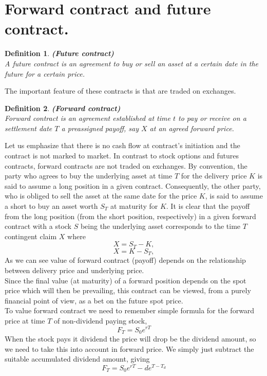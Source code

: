 \documentclass{book}
\newtheorem{definition}{Definition}[section]
\begin{document}
\section{Forward contract and future contract.}
\begin{definition}\textbf{(Future contract)}\\
A future contract is an agreement to buy or sell an asset at a certain date in the future for a certain price.
\end{definition}
The important feature of these contracts is that are traded on exchanges.
\begin{definition}\textbf{(Forward contract)}\\
Forward contract is an agreement established at time $t$ to pay or receive on a settlement date $T$ a preassigned payoff, say $X$ at an agreed forward price.  
\end{definition}
Let us emphasize that there is no cash flow at contract's initiation and the contract is not marked to market. In contrast to stock options and futures contracts, forward contracts are not traded on exchanges. By convention, the party who agrees to buy the underlying asset at time $T$ for
the delivery price $K$ is said to assume a long position in a given contract. Consequently, the other
party, who is obliged to sell the asset at the same date for the price $K$, is said to assume a short
to buy an asset worth $S_{T}$ at maturity for $K$. It is clear that the payoff from the long position (from the short position, respectively) in a given forward contract with a stock $S$ being the underlying asset corresponds to the time $T$ contingent claim $X$  where
$$
X=S_{T}-K,
$$
$$
X=K-S_{T},
$$
As we can see value of forward contract (payoff) depends on the relationship between delivery price and underlying price.\\
Since the final value (at maturity) of a forward position depends on the spot price which will then be prevailing, this contract can be viewed, from a purely financial point of view, as a bet on the future spot price.\\
To value forward contract we need to remember simple formula for the forward price at time $T$ of non-dividend paying stock,
$$
F_{T}=S_{0}e^{rT}
$$
When the stock pays it dividend the price will drop be the dividend amount, so we need to take this into account in forward price. We simply just subtract the suitable accumulated dividend amount, giving
$$
F_{T}=S_{0}e^{rT}-de^{T-T_{d}}
$$
\end{document}
